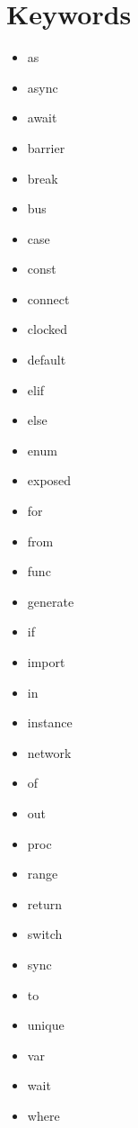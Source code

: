 \documentclass{article}
\begin{document}
\section*{Keywords}
\begin{multicols}{3}
  \begin{itemize}
  \item as
  \item async
  \item await
  \item barrier
  \item break
  \item bus
  \item case
  \item const
  \item connect
  \item clocked
  \item default
  \item elif
  \item else
  \item enum
  \item exposed
  \item for
  \item from
  \item func
  \item generate
  \item if
  \item import
  \item in
  \item instance
  \item network
  \item of
  \item out
  \item proc
  \item range
  \item return
  \item switch
  \item sync
  \item to
  \item unique
  \item var
  \item wait
  \item where
  \end{itemize}
\end{multicols}
\end{document}
